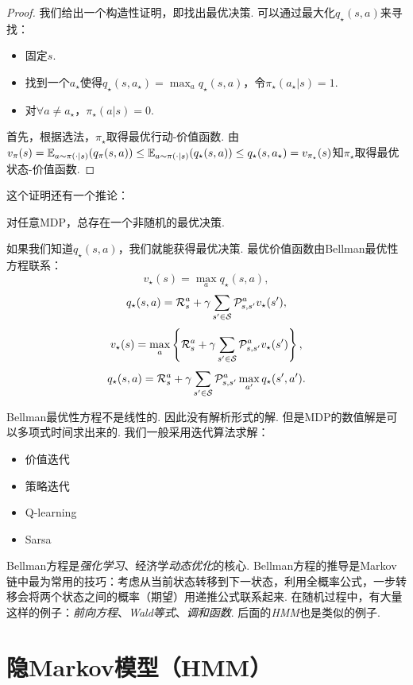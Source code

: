 \begin{proof}
我们给出一个构造性证明，即找出最优决策. 可以通过最大化$q_\star(s,a)$来寻找：
    \begin{itemize}
        \item 固定$s$.
        \item 找到一个$a_\star$使得$q_\star(s,a_\star)=\max_{a}q_\star(s,a)$，令$\pi_\star(a_\star|s)=1$.
        \item 对$\forall a\neq a_\star$，$\pi_\star(a|s)=0$.
    \end{itemize}
首先，根据选法，$\pi_\star$取得最优行动-价值函数. 由$v_\pi(s) = \mathbb{E}_{a\sim\pi(\cdot|s)}(q_\pi(s,a))\leq \mathbb{E}_{a\sim\pi(\cdot|s)}(q_\star(s,a))\leq q_\star(s,a_\star)=v_{\pi_\star}(s)$知$\pi_\star$取得最优状态-价值函数.
\end{proof}
这个证明还有一个推论：
\begin{corollary}
    对任意MDP，总存在一个非随机的最优决策.    
\end{corollary}

 如果我们知道$q_\star(s,a)$，我们就能获得最优决策. 最优价值函数由Bellman最优性方程联系：
\[v_\star(s) = \max_a q_\star(s,a),\]
\[q_\star(s,a) = \mathcal R_s^a + \gamma \sum_{s'\in \mathcal S}\mathcal P_{s,s'}^av_\star(s'),\]
\[v_\star(s) = \max_a\left\{\mathcal R_s^a + \gamma \sum_{s'\in \mathcal S}\mathcal P_{s,s'}^av_\star(s')\right\},\]
\[q_\star(s,a) = \mathcal R_s^a+\gamma \sum_{s'\in \mathcal S}\mathcal P_{s,s'}^a\max_{a'}q_\star(s',a').\]

Bellman最优性方程不是线性的. 因此没有解析形式的解. 但是MDP的数值解是可以多项式时间求出来的. 我们一般采用迭代算法求解：
\begin{itemize}
    \item 价值迭代
    \item 策略迭代
    \item Q-learning
    \item Sarsa
\end{itemize}


Bellman方程是\emph{强化学习}、经济学\emph{动态优化}的核心. Bellman方程的推导是Markov链中最为常用的技巧：考虑从当前状态转移到下一状态，利用全概率公式，一步转移会将两个状态之间的概率（期望）用递推公式联系起来. 在随机过程中，有大量这样的例子：\emph{前向方程}、\emph{Wald等式}、\emph{调和函数}. 后面的\emph{HMM}也是类似的例子.


\section{隐Markov模型（HMM）}

